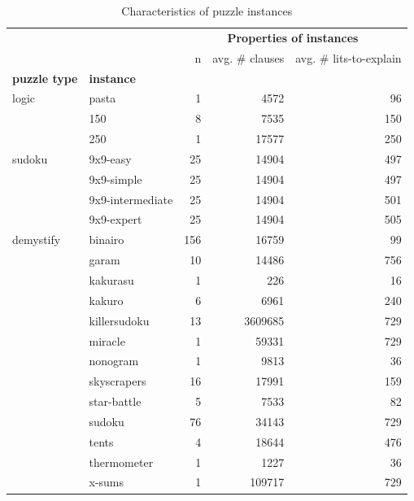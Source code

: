 \documentclass[twoside,11pt]{article}
\begin{document}
\begin{table}[!h]\centering
	\begin{tabular}{llrrr}
		\toprule
		&              &  \multicolumn{3}{c}{\textbf{Properties of instances}} \\
		&              &  n &  avg. $\#$ {clauses} &  avg. $\#$ lits-to-explain\\
		\textbf{puzzle type} & \textbf{instance} &              &          &                      \\
		\midrule
		logic & pasta &    1 &           4572 &                    96 \\
		& 150 &    8 &           7535 &                   150 \\
		& 250 &    1 &          17577 &                   250 \\\hline
		sudoku & 9x9-easy &   25 &          14904 &                   497 \\
		& 9x9-simple &   25 &          14904 &                   497 \\
		& 9x9-intermediate &   25 &          14904 &                   501 \\
		& 9x9-expert &   25 &          14904 &                   505 \\\hline
		demystify & binairo &  156 &          16759 &                    99 \\
		& garam &   10 &          14486 &                   756 \\
		& kakurasu &    1 &            226 &                    16 \\
		& kakuro &    6 &           6961 &                   240 \\
		& killersudoku &   13 &        3609685 &                   729 \\
		& miracle &    1 &          59331 &                   729 \\
		& nonogram &    1 &           9813 &                    36 \\
		& skyscrapers &   16 &          17991 &                   159 \\
		& star-battle &    5 &           7533 &                    82 \\
		& sudoku &   76 &          34143 &                   729 \\
		& tents &    4 &          18644 &                   476 \\
		& thermometer &    1 &           1227 &                    36 \\
		& x-sums &    1 &         109717 &                   729 \\
		\bottomrule
	\end{tabular}
	\caption{Characteristics of puzzle instances}
	\label{tab:puzzle-composition-family}
\end{table}



\end{document}
